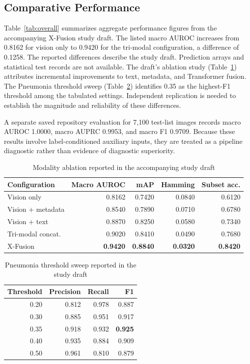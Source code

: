 \documentclass[pdflatex,sn-mathphys-num]{sn-jnl}
\begin{document}
\subsection{Comparative Performance}

Table~\ref{tab:overall} summarizes aggregate performance figures from the accompanying X-Fusion study draft. The listed macro AUROC increases from 0.8162 for vision only to 0.9420 for the tri-modal configuration, a difference of 0.1258. The reported differences describe the study draft. Prediction arrays and statistical test records are not available. The draft's ablation study (Table~\ref{tab:ablation}) attributes incremental improvements to text, metadata, and Transformer fusion. The Pneumonia threshold sweep (Table~\ref{tab:threshold}) identifies 0.35 as the highest-F1 threshold among the tabulated settings. Independent replication is needed to establish the magnitude and reliability of these differences.

A separate saved repository evaluation for 7,100 test-list images records macro AUROC 1.0000, macro AUPRC 0.9953, and macro F1 0.9709. Because these results involve label-conditioned auxiliary inputs, they are treated as a pipeline diagnostic rather than evidence of diagnostic superiority.

\begin{table}[htbp]
\caption{Modality ablation reported in the accompanying study draft}
\label{tab:ablation}
\centering\small
\setlength{\tabcolsep}{5pt}
\begin{tabular}{lrrrr}
\toprule
Configuration & Macro AUROC & mAP & Hamming & Subset acc.\\
\midrule
Vision only & 0.8162 & 0.7420 & 0.0840 & 0.6120\\
Vision + metadata & 0.8540 & 0.7890 & 0.0710 & 0.6780\\
Vision + text & 0.8870 & 0.8250 & 0.0580 & 0.7340\\
Tri-modal concat. & 0.9020 & 0.8410 & 0.0490 & 0.7680\\
X-Fusion & \textbf{0.9420} & \textbf{0.8840} & \textbf{0.0320} & \textbf{0.8420}\\
\bottomrule
\end{tabular}
\end{table}

\begin{table}[htbp]
\caption{Pneumonia threshold sweep reported in the study draft}
\label{tab:threshold}
\centering\small
\begin{tabular}{rrrr}
\toprule
Threshold & Precision & Recall & F1\\
\midrule
0.20 & 0.812 & 0.978 & 0.887\\
0.30 & 0.885 & 0.951 & 0.917\\
0.35 & 0.918 & 0.932 & \textbf{0.925}\\
0.40 & 0.935 & 0.884 & 0.909\\
0.50 & 0.961 & 0.810 & 0.879\\
\bottomrule
\end{tabular}
\end{table}
\end{document}
